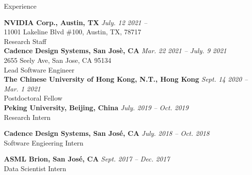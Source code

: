 
\begin{rSection}{Experience}

{\bf NVIDIA Corp., Austin, TX}         \hfill {\em July. 12 2021 -- } \\
11001 Lakeline Blvd \#100, Austin, TX, 78717 \\
Research Staff \\
	
{\bf Cadence Design Systems, San Jos\`{e}, CA}         \hfill {\em Mar. 22 2021 -- July. 9 2021 } \\
2655 Seely Ave, San Jose, CA 95134 \\
Lead Software Engineer \\
	
{\bf The Chinese University of Hong Kong, N.T., Hong Kong}         \hfill {\em Sept. 14 2020 -- Mar. 1 2021} \\
Postdoctoral Fellow \\

{\bf Peking University, Beijing, China}         \hfill {\em July. 2019 -- Oct. 2019} \\
Research Intern

{\bf Cadence Design Systems, San Jos\'{e}, CA}         \hfill {\em July. 2018 -- Oct. 2018} \\
Software Engieering Intern
	
{\bf ASML Brion, San Jos\'{e}, CA}         \hfill {\em Sept. 2017 -- Dec. 2017} \\
Data Scientist Intern



\end{rSection}


